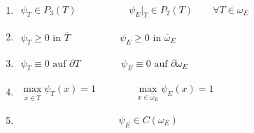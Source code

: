 \begin{lemma}[Eigenschaften]\ %
	\begin{enumerate}[label=\roman*)]
		\item $\begin{aligned}
			\psi_T\in P_3(T)
			\hspace{64pt}
			\psi_E\big|_T\in P_2(T)\qquad\forall T\in\omega_E
		\end{aligned}$
		\item $\begin{aligned}
			\psi_T\geq0\text{ in }\overline{T}
			\hspace{61pt}
			\psi_E\geq 0\text{ in }\overline{\omega}_E
		\end{aligned}$
		\item $\begin{aligned}
			\psi_T\equiv0\text{ auf }\partial T
			\hspace{50pt}
			\psi_E\equiv 0\text{ auf }\partial\omega_E
		\end{aligned}$
		\item $\begin{aligned}
			\max\limits_{x\in\overline{T}}\psi_T(x)=1
			\hspace{48pt}
			\max\limits_{x\in\overline{\omega}_E}\psi_E(x)=1
		\end{aligned}$
		\item $\begin{aligned}
			\hspace{120pt}
			\psi_E\in C(\omega_E)
		\end{aligned}$
	\end{enumerate}
\end{lemma}

